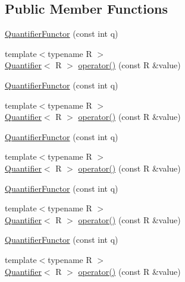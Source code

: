 \subsection*{Public Member Functions}
\begin{DoxyCompactItemize}
\item 
\mbox{\hyperlink{structfakeit_1_1QuantifierFunctor_ab88926a4a47ce8c12661adb1db90a238}{Quantifier\+Functor}} (const int q)
\item 
{\footnotesize template$<$typename R $>$ }\\\mbox{\hyperlink{structfakeit_1_1Quantifier}{Quantifier}}$<$ R $>$ \mbox{\hyperlink{structfakeit_1_1QuantifierFunctor_ae21e5262079b54f71eda7d3847967f06}{operator()}} (const R \&value)
\item 
\mbox{\hyperlink{structfakeit_1_1QuantifierFunctor_ab88926a4a47ce8c12661adb1db90a238}{Quantifier\+Functor}} (const int q)
\item 
{\footnotesize template$<$typename R $>$ }\\\mbox{\hyperlink{structfakeit_1_1Quantifier}{Quantifier}}$<$ R $>$ \mbox{\hyperlink{structfakeit_1_1QuantifierFunctor_ae21e5262079b54f71eda7d3847967f06}{operator()}} (const R \&value)
\item 
\mbox{\hyperlink{structfakeit_1_1QuantifierFunctor_ab88926a4a47ce8c12661adb1db90a238}{Quantifier\+Functor}} (const int q)
\item 
{\footnotesize template$<$typename R $>$ }\\\mbox{\hyperlink{structfakeit_1_1Quantifier}{Quantifier}}$<$ R $>$ \mbox{\hyperlink{structfakeit_1_1QuantifierFunctor_ae21e5262079b54f71eda7d3847967f06}{operator()}} (const R \&value)
\item 
\mbox{\hyperlink{structfakeit_1_1QuantifierFunctor_ab88926a4a47ce8c12661adb1db90a238}{Quantifier\+Functor}} (const int q)
\item 
{\footnotesize template$<$typename R $>$ }\\\mbox{\hyperlink{structfakeit_1_1Quantifier}{Quantifier}}$<$ R $>$ \mbox{\hyperlink{structfakeit_1_1QuantifierFunctor_ae21e5262079b54f71eda7d3847967f06}{operator()}} (const R \&value)
\item 
\mbox{\hyperlink{structfakeit_1_1QuantifierFunctor_ab88926a4a47ce8c12661adb1db90a238}{Quantifier\+Functor}} (const int q)
\item 
{\footnotesize template$<$typename R $>$ }\\\mbox{\hyperlink{structfakeit_1_1Quantifier}{Quantifier}}$<$ R $>$ \mbox{\hyperlink{structfakeit_1_1QuantifierFunctor_ae21e5262079b54f71eda7d3847967f06}{operator()}} (const R \&value)

\end{DoxyCompactItemize}
